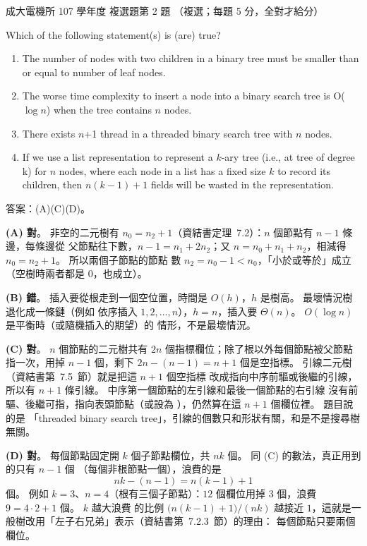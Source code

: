 \begin{pastexam}[label={px:ncku-107-ee-ds-01}]{成大電機所 107 學年度 複選題第 2 題}
（複選；每題 5 分，全對才給分）

Which of the following statement(s) is (are) true?
\begin{enumerate}[label=(\Alph*)]
\item The number of nodes with two children in a binary tree must be smaller than or equal to number
of leaf nodes.
\item The worse time complexity to insert a node into a binary search tree is O($\log n$) when the
tree contains $n$ nodes.
\item There exists $n$+1 thread in a threaded binary search tree with $n$ nodes.
\item If we use a list representation to represent a $k$-ary tree (i.e., at tree of degree k) for
$n$ nodes, where each node in a list has a fixed size $k$ to record its children, then $n(k-1)+1$
fields will be wasted in the representation.
\end{enumerate}
\end{pastexam}

\begin{pastsoln}
答案：(A)(C)(D)。

\textbf{(A) 對}。 非空的二元樹有 $n_0 = n_2 + 1$（資結書定理~7.2）：$n$ 個節點有 $n - 1$ 條邊，每條邊從
父節點往下數，$n - 1 = n_1 + 2n_2$；又 $n = n_0 + n_1 + n_2$，相減得 $n_0 = n_2 + 1$。 所以兩個子節點的節點
數 $n_2 = n_0 - 1 < n_0$，「小於或等於」成立（空樹時兩者都是 $0$，也成立）。

\textbf{(B) 錯}。 插入要從根走到一個空位置，時間是 $O(h)$，$h$ 是樹高。 最壞情況樹退化成一條鏈（例如
依序插入 $1, 2, \ldots, n$），$h = n$，插入要 $\Theta(n)$。 $O(\log n)$ 是平衡時（或隨機插入的期望）的
情形，不是最壞情況。

\textbf{(C) 對}。 $n$ 個節點的二元樹共有 $2n$ 個指標欄位；除了根以外每個節點被父節點指一次，用掉
$n - 1$ 個，剩下 $2n - (n - 1) = n + 1$ 個是空指標。 引線二元樹（資結書第~7.5~節）就是把這 $n + 1$ 個空指標
改成指向中序前驅或後繼的引線，所以有 $n + 1$ 條引線。 中序第一個節點的左引線和最後一個節點的右引線
沒有前驅、後繼可指，指向表頭節點（或設為 \NIL），仍然算在這 $n + 1$ 個欄位裡。 題目說的是
「threaded binary search tree」，引線的個數只和形狀有關，和是不是搜尋樹無關。

\textbf{(D) 對}。 每個節點固定開 $k$ 個子節點欄位，共 $nk$ 個。 同 (C) 的數法，真正用到的只有 $n - 1$ 個
（每個非根節點一個），浪費的是
\[
nk - (n - 1) = n(k - 1) + 1
\]
個。 例如 $k = 3$、$n = 4$（根有三個子節點）：$12$ 個欄位用掉 $3$ 個，浪費 $9 = 4 \cdot 2 + 1$ 個。 $k$ 越大浪費
的比例 $\bigl(n(k-1)+1\bigr)/(nk)$ 越接近 $1$，這就是一般樹改用「左子右兄弟」表示（資結書第~7.2.3~節）的理由：
每個節點只要兩個欄位。
\end{pastsoln}
